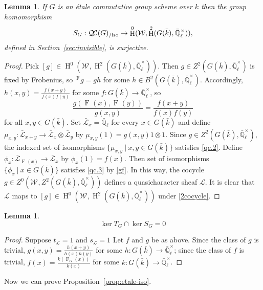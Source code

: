 \documentclass{amsart}
\theoremstyle{plain}
\newtheorem{lemma}[theorem]{Lemma}
\theoremstyle{definition}
\theoremstyle{remark}
\newcommand{\EE}{\mathbb{\bar Q}_\ell}
\newcommand{\bFq}{\bar{k}}
\newcommand{\Fq}{k}
\newcommand{\EEx}{\EE^\times}
\newcommand{\Weil}[1]{\mathcal{W}_{#1}}
\newcommand{\Frob}[1]{\operatorname{F}_{#1}}
\DeclareMathOperator{\Hh}{H}
\newcommand{\tq}{{\ \vert\ }}
\newcommand{\qcs}[1]{{\mathcal{#1}}}
\newcommand{\gqcs}[1]{{\mathcal{\bar #1}}}
\newcommand{\QC}{{\mathcal{Q\hskip-0.8pt C}}}
\newcommand{\QCiso}[1]{\QC(#1)_{/\text{iso}}}
\newcommand{\trFrob}[1]{t_{#1}}
\begin{document}

\begin{lemma}\label{lem:etale-2cocycle}
    If $G$ is an \'etale commutative group scheme over $\Fq$
    then the group homomorphism
    \[
    S_{G} : \QCiso{G} \to \Hh^0(\Weil{}, \Hh^2(G(\bFq),\EEx)),
    \]
    defined in Section~\ref{sec:invisible}, is surjective.
\end{lemma}

\begin{proof}
Pick $[g]\in \Hh^0(\Weil{}, \Hh^2(G(\bFq),\EEx))$. Then $g\in Z^2(G(\bFq),\EEx)$ is fixed by Frobenius, so $\,^{\Frob{}}g = g h$ for some $h\in B^2(G(\bFq),\EEx)$. Accordingly, $h(x,y) = \frac{f(x+y)}{f(x) f(y)}$ for some $f : G(\bFq) \to \EEx$, so
\begin{equation}\label{gf}
\frac{g(\Frob{}(x),\Frob{}(y))}{g(x,y)} = \frac{f(x+y)}{f(x) f(y)}
\end{equation}
for all $x,y\in G(\bFq)$.
Set $\gqcs{L}_x = \EE$ for every $x\in G(\bFq)$ and define $\mu_{x,y} : \gqcs{L}_{x+y} \to \gqcs{L}_x \otimes \gqcs{L}_y$ by $\mu_{x,y}(1) = g(x,y) 1 \otimes 1$.
Since $g\in Z^2(G(\bFq),\EEx)$, the indexed set of isomorphisms $\{ \mu_{x,y} \tq x,y \in G(\bFq) \}$ satisfies \ref{qc.2}.
Define $\phi_x : \gqcs{L}_{\Frob{}(x)}\to \gqcs{L}_x$ by $\phi_x(1) = f(x)$.
Then set of isomorphisms $\{ \phi_{x} \tq x \in G(\bFq) \}$ satisfies \ref{qc.3} by \eqref{gf}. In this way, the cocycle $g\in Z^0(\Weil{}, Z^2(G(\bFq),\EEx))$ defines a quasicharacter sheaf $\qcs{L}$. It is clear that $\qcs{L}$ maps to $[g] \in \Hh^0(\Weil{}, \Hh^2(G(\bFq),\EEx))$ under \eqref{2cocycle}.
\end{proof}

\begin{lemma}\label{lem:trivial}
\[
\ker T_{G} \cap \ker S_{G} = 0
\]
\end{lemma}

\begin{proof}
Suppose $\trFrob{\qcs{L}} =1$ and $s_\qcs{L} =1$
Let $f$ and $g$ be as above.
Since the class of $g$ is trivial, $g(x,y) = \frac{h(x+y)}{h(x) h(y)}$ for some $h : G(\bFq) \to \EEx$;
since the class of $f$ is trivial, $f(x) = \frac{k(\Frob{G}(x))}{k(x)}$ for some $k : G(\bFq) \to \EEx$.
\end{proof}

Now we can prove Proposition~\ref{prop:etale-iso}.
\end{document}
